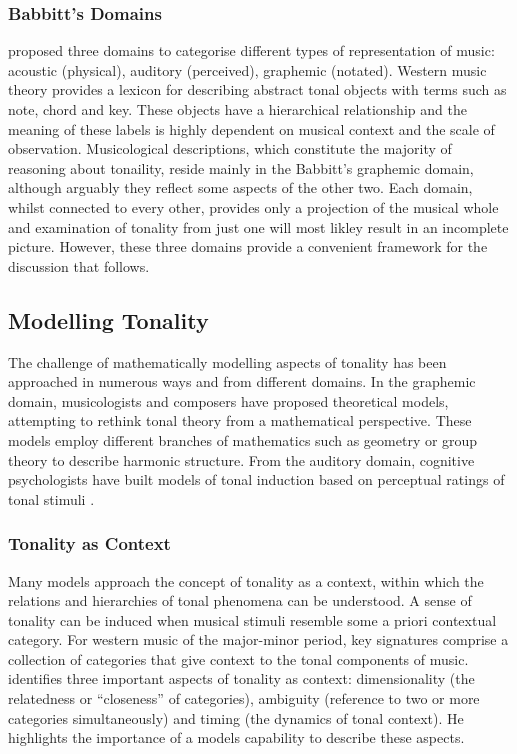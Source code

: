 \documentclass{article}
\begin{document}
\subsubsection{Babbitt's Domains}
\label{sec-2-1-2}

\citet{Babbitt1965} proposed three domains to categorise different
types of representation of music: acoustic (physical), auditory
(perceived), graphemic (notated). Western music theory provides a
lexicon for describing abstract tonal objects with terms such as note,
chord and key. These objects have a hierarchical relationship and the
meaning of these labels is highly dependent on musical context and the
scale of observation. Musicological descriptions, which constitute the
majority of reasoning about tonaility, reside mainly in the Babbitt's
graphemic domain, although arguably they reflect some aspects of the
other two. Each domain, whilst connected to every other, provides only
a projection of the musical whole and examination of tonality from
just one will most likley result in an incomplete picture. However,
these three domains provide a convenient framework for the discussion
that follows.
\subsection{Modelling Tonality}
\label{sec-2-2}

The challenge of mathematically modelling aspects of tonality has been
approached in numerous ways and from different domains. In the
graphemic domain, musicologists and composers have proposed
theoretical models, attempting to rethink tonal theory from a
mathematical perspective. These models employ different branches of
mathematics such as geometry \citep{Tymoczko2012} or group theory
\citep{Ring2011} to describe harmonic structure. From the auditory
domain, cognitive psychologists have built models of tonal induction
based on perceptual ratings of tonal stimuli \citep{Krumhansl1990}.
\subsubsection{Tonality as Context}
\label{sec-2-2-1}

Many models approach the concept of tonality as a context, within
which the relations and hierarchies of tonal phenomena can be
understood. A sense of tonality can be induced when musical stimuli
resemble some a priori contextual category. For western music of the
major-minor period, key signatures comprise a collection of categories
that give context to the tonal components of
music. \citet{Martorell2013} identifies three important aspects of
tonality as context: dimensionality (the relatedness or ``closeness'' of
categories), ambiguity (reference to two or more categories
simultaneously) and timing (the dynamics of tonal context). He
highlights the importance of a models capability to describe these
aspects. 
\end{document}
